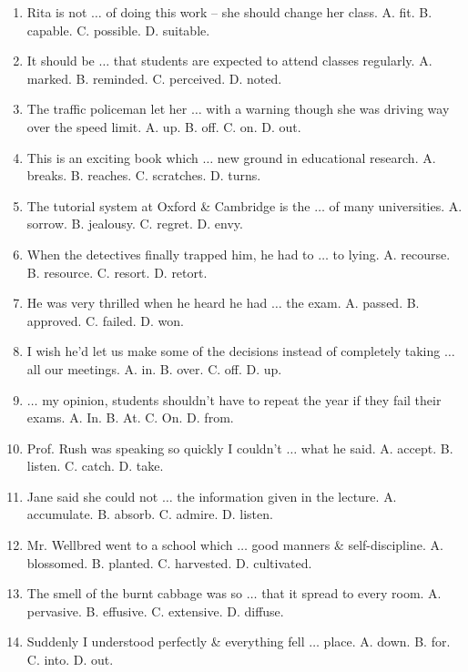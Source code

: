\documentclass{article}
\numberwithin{equation}{section}
\begin{document}
\begin{enumerate}[leftmargin=8mm]
	\item Rita is not $\ldots$ of doing this work -- she should change her class. {\sf A.} fit. {\sf B.} capable. {\sf C.} possible. {\sf D.} suitable.
	\item It should be $\ldots$ that students are expected to attend classes regularly. {\sf A.} marked. {\sf B.} reminded. {\sf C.} perceived. {\sf D.} noted.
	\item The traffic policeman let her $\ldots$ with a warning though she was driving way over the speed limit. {\sf A.} up. {\sf B.} off. {\sf C.} on. {\sf D.} out.
	\item This is an exciting book which $\ldots$ new ground in educational research. {\sf A.} breaks. {\sf B.} reaches. {\sf C.} scratches. {\sf D.} turns.
	\item The tutorial system at Oxford \& Cambridge is the $\ldots$ of many universities. {\sf A.} sorrow. {\sf B.} jealousy. {\sf C.} regret. {\sf D.} envy.
	\item When the detectives finally trapped him, he had to $\ldots$ to lying. {\sf A.} recourse. {\sf B.} resource. {\sf C.} resort. {\sf D.} retort.
	\item He was very thrilled when he heard he had $\ldots$ the exam. {\sf A.} passed. {\sf B.} approved. {\sf C.} failed. {\sf D.} won.
	\item I wish he'd let us make some of the decisions instead of completely taking $\ldots$ all our meetings. {\sf A.} in. {\sf B.} over. {\sf C.} off. {\sf D.} up.
	\item $\ldots$ my opinion, students shouldn't have to repeat the year if they fail their exams. {\sf A.} In. {\sf B.} At. {\sf C.} On. {\sf D.} from.
	\item Prof. Rush was speaking so quickly I couldn't $\ldots$ what he said. {\sf A.} accept. {\sf B.} listen. {\sf C.} catch. {\sf D.} take.
	\item Jane said she could not $\ldots$ the information given in the lecture. {\sf A.} accumulate. {\sf B.} absorb. {\sf C.} admire. {\sf D.} listen.
	\item Mr. Wellbred went to a school which $\ldots$ good manners \& self-discipline. {\sf A.} blossomed. {\sf B.} planted. {\sf C.} harvested. {\sf D.} cultivated.
	\item The smell of the burnt cabbage was so $\ldots$ that it spread to every room. {\sf A.} pervasive. {\sf B.} effusive. {\sf C.} extensive. {\sf D.} diffuse.
	\item Suddenly I understood perfectly \& everything fell $\ldots$ place. {\sf A.} down. {\sf B.} for. {\sf C.} into. {\sf D.} out.

\end{enumerate}
\end{document}
